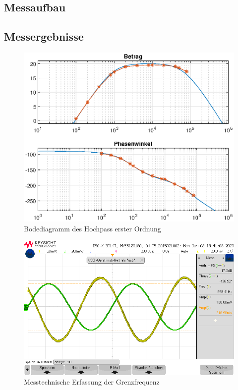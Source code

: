 \subsection{Messaufbau}

\subsection{Messergebnisse}
\begin{figure}[H]
    \centering
    \includegraphics[width=\costumPicWidth]{Lab_2/Plots/HP_first_order.eps}
    \caption{Bodediagramm des Hochpass erster Ordnung}
    \label{fig:Bode_HP_first_order}
\end{figure}
\begin{figure}[H]
    \centering
    \includegraphics[width=\costumPicWidth]{Lab_2/Messungen/HP_first_order/scope_70.png}
    \caption{Messtechnische Erfassung der Grenzfrequenz}
    \label{fig:HP_FO_fg}
\end{figure}
